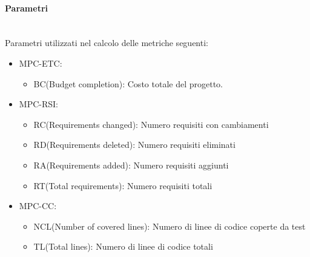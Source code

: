 \paragraph{Parametri}\mbox{}\\
Parametri utilizzati nel calcolo delle metriche seguenti:
\begin{itemize}
    \item MPC-ETC:
          \begin{itemize}
              \item BC(Budget completion): Costo totale del progetto.
          \end{itemize}
    \item MPC-RSI:
          \begin{itemize}
              \item RC(Requirements changed): Numero requisiti con cambiamenti
              \item RD(Requirements deleted): Numero requisiti eliminati
              \item RA(Requirements added): Numero requisiti aggiunti
              \item RT(Total requirements): Numero requisiti totali
          \end{itemize}

    \item MPC-CC:
          \begin{itemize}
              \item NCL(Number of covered lines): Numero di linee di codice coperte da test
              \item TL(Total lines): Numero di linee di codice totali
          \end{itemize}
\end{itemize}

